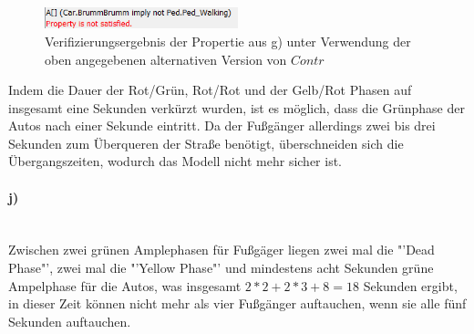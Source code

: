 \begin{figure}[H] 
	\centering 
	\includegraphics[width=0.5\textwidth]{./UPAAAL_Screens/2i_Verified}
	\caption[Aufgabe 2i)]{Verifizierungsergebnis der Propertie aus g) unter Verwendung der oben angegebenen alternativen Version von $Contr$}    
\end{figure}

Indem die Dauer der Rot/Grün, Rot/Rot und der Gelb/Rot Phasen auf insgesamt eine Sekunden verkürzt wurden, ist es möglich, dass die Grünphase der Autos nach einer Sekunde eintritt. Da der Fußgänger allerdings zwei bis drei Sekunden zum Überqueren der Straße benötigt, überschneiden sich die Übergangszeiten, wodurch das Modell nicht mehr sicher ist. 




\paragraph{j)}\mbox{} \\

Zwischen zwei grünen Amplephasen für Fußgäger liegen zwei mal die "'Dead Phase"', zwei mal die "'Yellow Phase"' und mindestens acht Sekunden grüne Ampelphase für die Autos, was insgesamt $2*2+2*3+8=18$ Sekunden ergibt, in dieser Zeit können nicht mehr als vier Fußgänger auftauchen, wenn sie alle fünf Sekunden auftauchen.
